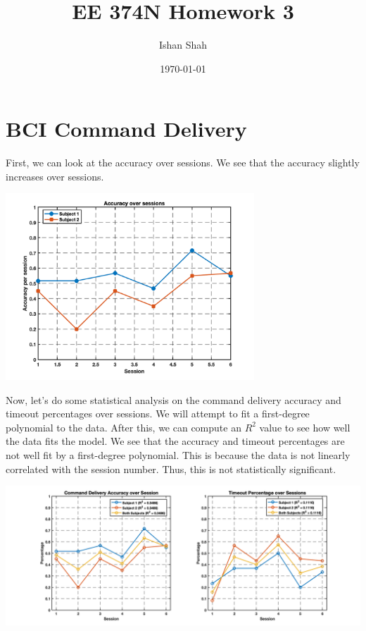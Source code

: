 \documentclass[12pt]{article}
\begin{document}
\title{EE 374N Homework 3}
\author{Ishan Shah}
\date{\today}
\maketitle

\section{BCI Command Delivery}
First, we can look at the accuracy over sessions. We see that the accuracy slightly increases over sessions.

\begin{center}
    \includegraphics[width=0.7\textwidth]{1_1.png}
\end{center}

Now, let's do some statistical analysis on the command delivery accuracy and timeout percentages over sessions. We will attempt to fit a first-degree polynomial to the data. After this, we can compute an $R^2$ value to see how well the data fits the model. We see that the accuracy and timeout percentages are not well fit by a first-degree polynomial. This is because the data is not linearly correlated with the session number. Thus, this is not statistically significant.

\begin{center}
    \includegraphics[width=\textwidth]{1_2.png}
\end{center}
\end{document}
